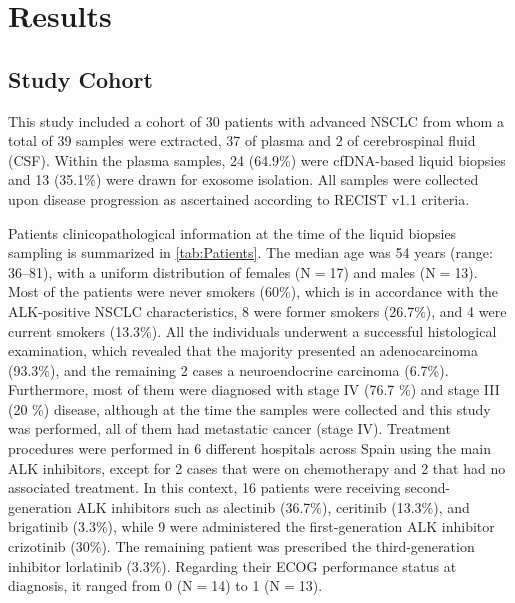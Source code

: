 \chapter{Results}

\section{Study Cohort}

This study included a cohort of 30 patients with advanced NSCLC from whom a total of 39 samples were extracted, 37 of plasma and 2 of cerebrospinal fluid (CSF). Within the plasma samples, 24 (64.9\%) were cfDNA-based liquid biopsies and 13 (35.1\%) were drawn for exosome isolation. All samples were collected upon disease progression as ascertained according to RECIST v1.1 criteria.

Patients clinicopathological information at the time of the liquid biopsies sampling is summarized in \autoref{tab:Patients}. The median age was 54 years (range: 36–81), with a uniform distribution of females (N$=$17) and males (N$=$13). Most of the patients were never smokers (60\%), which is in accordance with the ALK-positive NSCLC characteristics, 8 were former smokers (26.7\%), and 4 were current smokers (13.3\%). All the individuals underwent a successful histological examination, which revealed that the majority presented an adenocarcinoma (93.3\%), and the remaining 2 cases a neuroendocrine carcinoma (6.7\%). Furthermore, most of them were diagnosed with stage IV (76.7 \%) and stage III (20 \%) disease, although at the time the samples were collected and this study was performed, all of them had metastatic cancer (stage IV). Treatment procedures were performed in 6 different hospitals across Spain using the main ALK inhibitors, except for 2 cases that were on chemotherapy and 2 that had no associated treatment. In this context, 16 patients were receiving second-generation ALK inhibitors such as alectinib (36.7\%), ceritinib (13.3\%), and brigatinib (3.3\%), while 9 were administered the first-generation ALK inhibitor crizotinib (30\%). The remaining patient was prescribed the third-generation inhibitor lorlatinib (3.3\%). Regarding their ECOG performance status at diagnosis, it ranged from 0 (N$=$14) to 1 (N$=$13).

